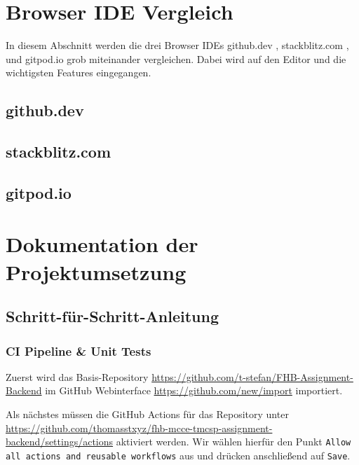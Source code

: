 \section{Browser IDE Vergleich}
In diesem Abschnitt werden die drei Browser IDEs
github.dev \cite{githubDevWebsite},
stackblitz.com \cite{stackblitzcomWebsite},
und
gitpod.io \cite{gitpodioWebsite}
grob miteinander vergleichen.
Dabei wird auf den Editor und die wichtigsten Features eingegangen.

\subsection{github.dev}

\subsection{stackblitz.com}

\subsection{gitpod.io}


\clearpage
\section{Dokumentation der Projektumsetzung}

\subsection{Schritt-für-Schritt-Anleitung}

\subsubsection{CI Pipeline \& Unit Tests}
Zuerst wird das Basis-Repository 
\url{https://github.com/t-stefan/FHB-Assignment-Backend}
im GitHub Webinterface
\url{https://github.com/new/import} 
importiert.


\noindent
Als nächstes müssen die GitHub Actions für das Repository unter
\url{https://github.com/thomasstxyz/fhb-mcce-tmcsp-assignment-backend/settings/actions}
aktiviert werden.
Wir wählen hierfür den Punkt \verb|Allow all actions and reusable workflows| aus
und drücken anschließend auf \verb|Save|. \\

